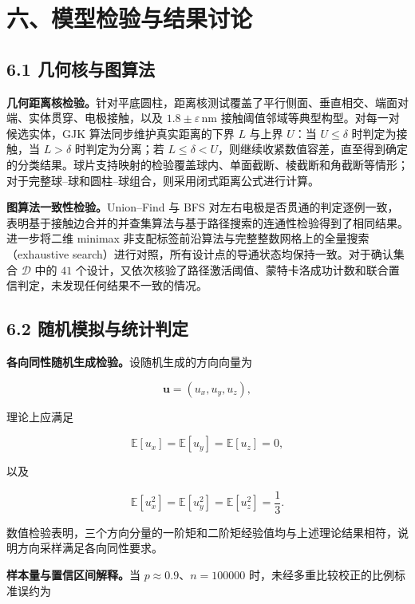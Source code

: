 \section{六、模型检验与结果讨论}\label{ux516dux6a21ux578bux68c0ux9a8cux4e0eux7ed3ux679cux8ba8ux8bba}

\subsection{6.1 几何核与图算法}\label{ux51e0ux4f55ux6838ux4e0eux56feux7b97ux6cd5ux68c0ux9a8c}

\textbf{几何距离核检验。}针对平底圆柱，距离核测试覆盖了平行侧面、垂直相交、端面对端、实体贯穿、电极接触，以及 \(1.8\pm\varepsilon\,\mathrm{nm}\) 接触阈值邻域等典型构型。对每一对候选实体，GJK 算法同步维护真实距离的下界 \(L\) 与上界 \(U\)：当 \(U\le\delta\) 时判定为接触，当 \(L>\delta\) 时判定为分离；若 \(L\le\delta<U\)，则继续收紧数值容差，直至得到确定的分类结果。球片支持映射的检验覆盖球内、单面截断、棱截断和角截断等情形；对于完整球--球和圆柱--球组合，则采用闭式距离公式进行计算。

\textbf{图算法一致性检验。}Union--Find 与 BFS 对左右电极是否贯通的判定逐例一致，表明基于接触边合并的并查集算法与基于路径搜索的连通性检验得到了相同结果。进一步将二维 minimax 非支配标签前沿算法与完整整数网格上的全量搜索（exhaustive search）进行对照，所有设计点的导通状态均保持一致。对于确认集合 \(\mathcal D\) 中的 \(41\) 个设计，又依次核验了路径激活阈值、蒙特卡洛成功计数和联合置信判定，未发现任何结果不一致的情况。

\subsection{6.2 随机模拟与统计判定}\label{ux968fux673aux6a21ux62dfux4e0eux7edfux8ba1ux68c0ux9a8c}

\textbf{各向同性随机生成检验。}设随机生成的方向向量为

\[
\mathbf u=(u_x,u_y,u_z),
\]

理论上应满足

\[
\mathbb E[u_x]=\mathbb E[u_y]=\mathbb E[u_z]=0,
\]

以及

\[
\mathbb E[u_x^2]=\mathbb E[u_y^2]=\mathbb E[u_z^2]=\frac13.
\]

数值检验表明，三个方向分量的一阶矩和二阶矩经验值均与上述理论结果相符，说明方向采样满足各向同性要求。

\textbf{样本量与置信区间解释。}当 \(p\approx0.9\)、\(n=100000\) 时，未经多重比较校正的比例标准误约为


